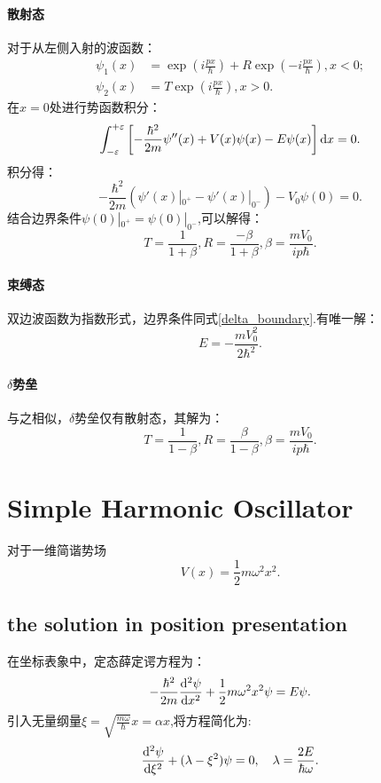 \paragraph{散射态} 对于从左侧入射的波函数：
\begin{align}
    \psi_1(x)&=\exp\left(i\frac{px}{\hbar}\right)+R\exp\left(-i\frac{px}{\hbar}\right),x<0;\\
    \psi_2(x)&=T\exp\left(i\frac{px}{\hbar}\right),  x>0.
\end{align}
在$x=0$处进行势函数积分：
\begin{equation}
    \int_{-\varepsilon}^{+\varepsilon}\left[-\frac{\hbar^2}{2m}\psi''(x)+V(x)\psi(x)-E\psi(x)\right]\mathrm{d} x=0.
\end{equation}
积分得：
\begin{equation}
    -\frac{\hbar^2}{2m}(\psi'(x)|_{0^+}-\psi'(x)|_{0^-})-V_0\psi(0)=0.
    \label{delta_boundary}
\end{equation}
结合边界条件$\psi(0)|_{0^+}=\psi(0)|_{0^-}$,可以解得：
\begin{equation}
    T=\frac{1}{1+\beta}, R=\frac{-\beta}{1+\beta}, \beta=\frac{mV_0}{ip\hbar}.
\end{equation}

\paragraph{束缚态} 双边波函数为指数形式，边界条件同式\ref{delta_boundary}.有唯一解：
\begin{equation}
    E=-\frac{mV_0^2}{2\hbar^2}.
\end{equation}

\paragraph{$\delta$势垒}与之相似，$\delta$势垒仅有散射态，其解为：
\begin{equation}
    T=\frac{1}{1-\beta}, R=\frac{\beta}{1-\beta}, \beta=\frac{mV_0}{ip\hbar}.
\end{equation}
\section{Simple Harmonic Oscillator}
对于一维简谐势场
\begin{equation}
    V(x)=\frac{1}{2}m\omega^2x^2.
\end{equation}
\subsection{the solution in position presentation}
在坐标表象中，定态薛定谔方程为：
\begin{equation}
    -\frac{\hbar^2}{2m}\frac{\mathrm{d}^2 \psi}{\mathrm{d} x^2}+\frac{1}{2}m\omega^2x^2\psi=E\psi.
\end{equation}
引入无量纲量$\xi=\sqrt{\frac{m\omega}{\hbar}}x=\alpha x$,将方程简化为:
\begin{equation}
    \frac{\mathrm{d}^2 \psi}{\mathrm{d} \xi^2}+(\lambda-\xi^2)\psi=0, \quad \lambda=\frac{2E}{\hbar\omega}.
\end{equation}

